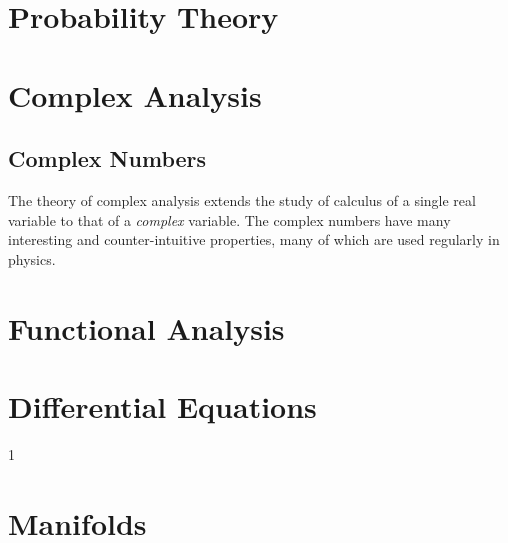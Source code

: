 \documentclass{book}                                                           %
\def\compilegeometry{0}
\begin{document}
            \part{Probability Theory}
                \renewcommand{\PARPATH}{\TOPPATH/Probability_Theory}
                \renewcommand{\PATH}{\PARPATH}
                
            \part{Complex Analysis}
                \renewcommand{\PARPATH}{\TOPPATH/Complex_Analysis}
                \chapter{Complex Numbers}
                    \renewcommand{\PATH}{\PARPATH/Complex_Numbers}
                    \label{chapt:Complex_Numbers}%
                    The theory of complex analysis extends the study of calculus
                    of a single real variable to that of a \textit{complex}
                    variable. The complex numbers have many interesting and
                    counter-intuitive properties, many of which are used
                    regularly in physics.
                    
            \part{Functional Analysis}
                \renewcommand{\PARPATH}{\TOPPATH/Functional_Analysis}
                
                
            \part{Differential Equations}
                \renewcommand{\PARPATH}{\TOPPATH/Differential_Equations}
                
        \clearpage
        \setcounter{endpage}{\thepage}
    \fi

    \renewcommand{\TOPPATH}{books}
    \if\compilegeometry1
            \label{book:Geometry}%
            \renewcommand{\PATH}{\TOPPATH/Geometry}
            \setcounter{page}{\value{endpage}}
            \part{Manifolds}
                \renewcommand{\PARPATH}{\TOPPATH/Geometry/Manifolds}
\end{document}

